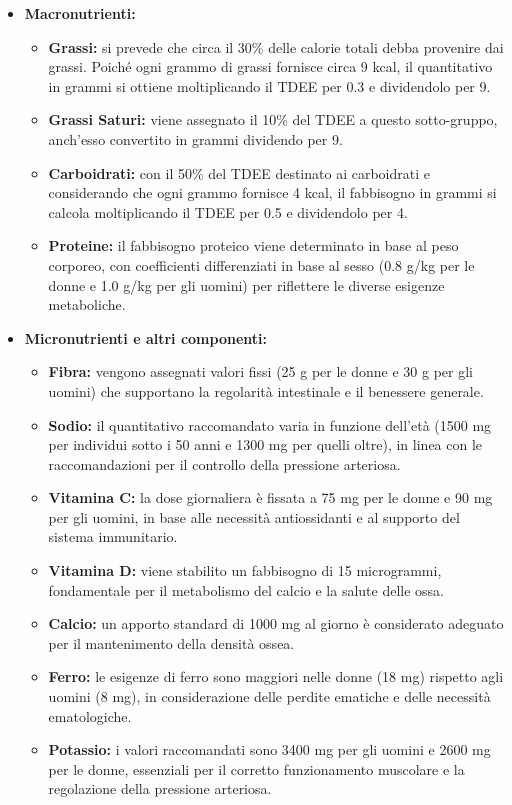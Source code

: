 \documentclass[11pt,a4paper]{article}
\begin{document}
\begin{itemize}
  \item \textbf{Macronutrienti:}
    \begin{itemize}
      \item \textbf{Grassi:} si prevede che circa il 30\% delle calorie totali debba provenire dai grassi. Poiché ogni grammo di grassi fornisce circa 9 kcal, il quantitativo in grammi si ottiene moltiplicando il TDEE per 0.3 e dividendolo per 9.
      \item \textbf{Grassi Saturi:} viene assegnato il 10\% del TDEE a questo sotto-gruppo, anch’esso convertito in grammi dividendo per 9.
      \item \textbf{Carboidrati:} con il 50\% del TDEE destinato ai carboidrati e considerando che ogni grammo fornisce 4 kcal, il fabbisogno in grammi si calcola moltiplicando il TDEE per 0.5 e dividendolo per 4.
      \item \textbf{Proteine:} il fabbisogno proteico viene determinato in base al peso corporeo, con coefficienti differenziati in base al sesso (0.8 g/kg per le donne e 1.0 g/kg per gli uomini) per riflettere le diverse esigenze metaboliche.
    \end{itemize}
  \item \textbf{Micronutrienti e altri componenti:}
    \begin{itemize}
      \item \textbf{Fibra:} vengono assegnati valori fissi (25 g per le donne e 30 g per gli uomini) che supportano la regolarità intestinale e il benessere generale.
      \item \textbf{Sodio:} il quantitativo raccomandato varia in funzione dell'età (1500 mg per individui sotto i 50 anni e 1300 mg per quelli oltre), in linea con le raccomandazioni per il controllo della pressione arteriosa.
      \item \textbf{Vitamina C:} la dose giornaliera è fissata a 75 mg per le donne e 90 mg per gli uomini, in base alle necessità antiossidanti e al supporto del sistema immunitario.
      \item \textbf{Vitamina D:} viene stabilito un fabbisogno di 15 microgrammi, fondamentale per il metabolismo del calcio e la salute delle ossa.
      \item \textbf{Calcio:} un apporto standard di 1000 mg al giorno è considerato adeguato per il mantenimento della densità ossea.
      \item \textbf{Ferro:} le esigenze di ferro sono maggiori nelle donne (18 mg) rispetto agli uomini (8 mg), in considerazione delle perdite ematiche e delle necessità ematologiche.
      \item \textbf{Potassio:} i valori raccomandati sono 3400 mg per gli uomini e 2600 mg per le donne, essenziali per il corretto funzionamento muscolare e la regolazione della pressione arteriosa.
    \end{itemize}
\end{itemize}
\end{document}
